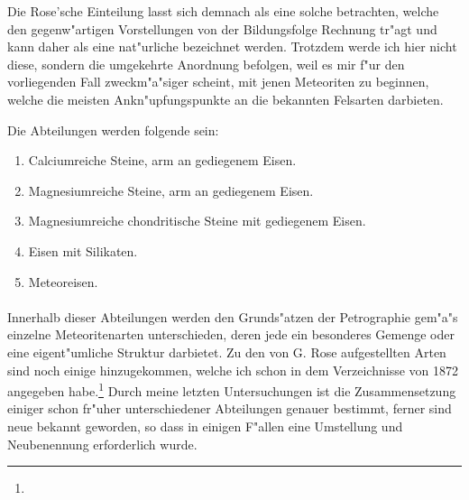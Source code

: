 \documentclass[a4paper, 11pt, oneside, polutonikogreek, german]{article}
\begin{document}
Die Rose'sche Einteilung lasst sich demnach als eine solche betrachten, welche den gegenw"artigen Vorstellungen von der Bildungsfolge Rechnung tr"agt und kann daher als eine nat"urliche bezeichnet werden. Trotzdem werde ich hier nicht diese, sondern die umgekehrte Anordnung befolgen, weil es mir f"ur den vorliegenden Fall zweckm"a"siger scheint, mit jenen Meteoriten zu beginnen, welche die meisten Ankn"upfungspunkte an die bekannten Felsarten darbieten.

Die Abteilungen werden folgende sein:
\begin{enumerate}
    \item Calciumreiche Steine, arm an gediegenem Eisen.  
    \item Magnesiumreiche Steine, arm an gediegenem Eisen.  
    \item Magnesiumreiche chondritische Steine mit gediegenem Eisen.  
    \item Eisen mit Silikaten.  
    \item Meteoreisen.
\end{enumerate}
\paragraph*{}
Innerhalb dieser Abteilungen werden den Grunds"atzen der Petrographie gem"a"s einzelne Meteoritenarten unterschieden, deren jede ein besonderes Gemenge oder eine eigent"umliche Struktur darbietet. Zu den von G. Rose aufgestellten Arten sind noch einige hinzugekommen, welche ich schon in dem Verzeichnisse von 1872 angegeben habe.\footnote{} Durch meine letzten Untersuchungen ist die Zusammensetzung einiger schon fr"uher unterschiedener Abteilungen genauer bestimmt, ferner sind neue bekannt geworden, so dass in einigen F"allen eine Umstellung und Neubenennung erforderlich wurde.
\end{document}
